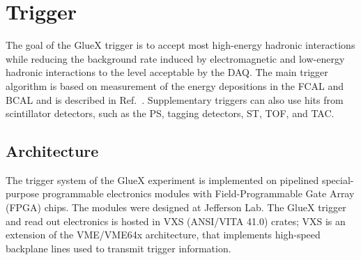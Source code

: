 
\section[Trigger]{Trigger \label{sec:trig}}
The goal of the GlueX trigger is to accept most high-energy hadronic interactions while reducing the background rate induced by electromagnetic and low-energy hadronic interactions to the level acceptable 
by the DAQ.  The main trigger algorithm is based on measurement of the energy depositions in the FCAL and BCAL and is described in Ref.~\cite{somov_l1,somov_l11}. Supplementary triggers can also use hits from scintillator detectors, such as the PS, tagging detectors, ST, TOF, and TAC.

\subsection{Architecture \label{sec:trigarchitecture}}
The trigger system of the GlueX experiment\cite{GlueX:2013twa} is implemented on pipelined special-purpose programmable electronics modules with Field-Programmable Gate Array (FPGA) chips. The modules were designed at Jefferson Lab.  The GlueX trigger and read out electronics is hosted in VXS (ANSI/VITA 41.0) crates; VXS is an extension of the VME/VME64x architecture, that implements high-speed backplane lines used to transmit trigger information. 

